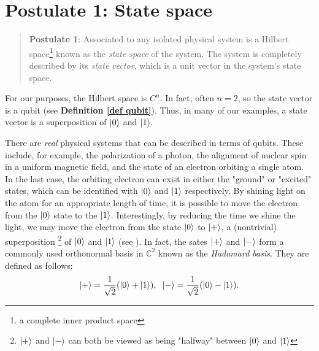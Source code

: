 \section{Postulate 1: State space}


\begin{quote}
    \textbf{Postulate 1}: Associated to any isolated physical system is a Hilbert space\footnote{a complete inner product space} known as the {\emph{state space}} of the system. The system is completely described by its {\emph{state vector}}, which is a unit vector in the system's state space.
\end{quote}

For our purposes, the Hilbert space is $C^n$. In fact, often $n=2$, so the state vector is a qubit (see \textbf{Definition \ref{def qubit}}).  Thus, in many of our examples, a state vector is a superposition of $\ket{0}$ and $\ket{1}$.

There are {\emph{real}} physical systems that can be described in terms of qubits.  These include, for example, the polarization of a photon, the alignment of nuclear spin in a uniform magnetic field, and the state of an electron orbiting a single atom.  In the last case, the orbiting electron can exist in either the "ground" or "excited" states, which can be identified with $\ket{0}$ and $\ket{1}$ respectively. By shining light on the atom for an appropriate length of time, it is possible to move the electron from the $\ket{0}$ state to the $\ket{1}$. Interestingly, by reducing the time we shine the light, we may move the electron from the state $\ket{0}$ to $\ket{+}$, a (nontrivial) superposition
\footnote{
$\ket{+}$ and $\ket{-}$ can both be viewed as being "halfway" between $\ket{0}$ and $\ket{1}$} of $\ket{0}$ and $\ket{1}$ (see \cite{Nielsen}).  In fact, the sates $\ket{+}$ and $\ket{-}$ form a commonly used orthonormal basis in $\mathbb{C}^2$ known as the \textit{Hadamard basis}. They are defined as follows:
\begin{equation} \label{eqn: hadamard basis}
\ket{+}=\frac{1}{\sqrt{2}}(\ket{0}+\ket{1}),\hspace{.2 cm}
\ket{-}=\frac{1}{\sqrt{2}}(\ket{0}-\ket{1}).
\end{equation}


\pagebreak

